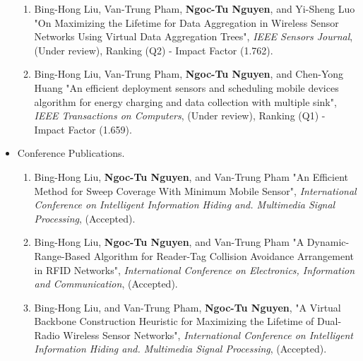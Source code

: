 \begin{publication}
\begin{itemize}
\begin{enumerate}
        \item Bing-Hong Liu, Van-Trung Pham, \textbf{Ngoc-Tu Nguyen}, and Yi-Sheng Luo
		"On Maximizing the Lifetime for Data Aggregation in Wireless Sensor Networks Using Virtual Data Aggregation Trees",
		\emph{IEEE Sensors Journal}, (Under review), Ranking (Q2) - Impact Factor (1.762).

        \item Bing-Hong Liu, Van-Trung Pham, \textbf{Ngoc-Tu Nguyen}, and Chen-Yong Huang
		"An efficient deployment sensors and scheduling mobile devices algorithm for energy charging and data collection with multiple sink", \emph{IEEE Transactions on Computers}, (Under review), Ranking (Q1) - Impact Factor (1.659).
    \end{enumerate}

\item {\color{blue}Conference Publications}.
    \begin{enumerate}
        \item Bing-Hong Liu, \textbf{Ngoc-Tu Nguyen}, and Van-Trung Pham
		"An Efficient Method for Sweep Coverage With Minimum Mobile Sensor",
		\emph{International Conference on Intelligent Information Hiding and. Multimedia Signal Processing}, (Accepted).

        \item Bing-Hong Liu, \textbf{Ngoc-Tu Nguyen}, and Van-Trung Pham
		"A Dynamic-Range-Based Algorithm for Reader-Tag Collision Avoidance Arrangement in RFID Networks",
		\emph{International Conference on Electronics, Information and Communication}, (Accepted).

        \item Bing-Hong Liu, and Van-Trung Pham, \textbf{Ngoc-Tu Nguyen},
		"A Virtual Backbone Construction Heuristic for Maximizing the Lifetime of Dual-Radio Wireless Sensor Networks",
		\emph{International Conference on Intelligent Information Hiding and. Multimedia Signal Processing}, (Accepted).
    \end{enumerate}


\end{itemize}

\end{publication}

